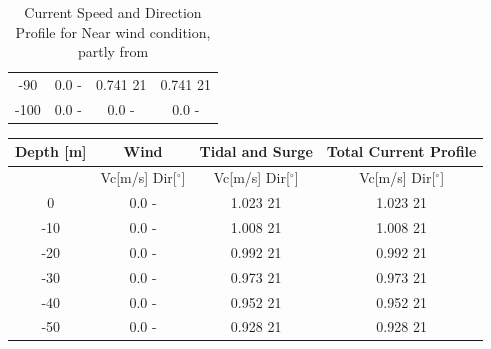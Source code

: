 \begin{table} [H]
\begin{tabular}{ |c|c|c|c|}
 -90 & 0.0 \hspace{0.7cm} - & 0.741 \hspace{0.7cm} 21  & 0.741 \hspace{1.15cm} 21 \\ 
 -100 & 0.0 \hspace{0.7cm} - & 0.0 \hspace{0.7cm} -  & 0.0 \hspace{1.15cm} - \\ 
 \hline
\end{tabular}
\caption{Current Speed and Direction Profile for Near wind condition, partly from \cite{Lifes50+D1.1}}
\label{table:tidcur}
\end{table}   

\begin{table} [H]
\centering
\begin{tabular}{ |c|c|c|c|}
\hline
Depth [m] & Wind & Tidal and Surge & Total Current Profile \\
 \hline
 \hline
 & Vc[m/s] \hspace{0.3cm} Dir[$^{\circ}$] &  Vc[m/s] \hspace{0.3cm} Dir[$^{\circ}$] & Vc[m/s] \hspace{0.3cm} Dir[$^{\circ}$] \\
 \hline
 0 & 0.0 \hspace{0.7cm} - & 1.023 \hspace{0.7cm} 21  & 1.023 \hspace{0.7cm} 21 \\
 -10 & 0.0 \hspace{0.7cm} - & 1.008 \hspace{0.7cm} 21  & 1.008 \hspace{0.7cm} 21 \\
 -20 & 0.0 \hspace{0.7cm} - & 0.992 \hspace{0.7cm} 21  & 0.992
 \hspace{0.7cm} 21 \\
 -30 & 0.0 \hspace{0.7cm} - & 0.973 \hspace{0.7cm} 21  & 0.973 \hspace{0.7cm} 21 \\
 -40 & 0.0 \hspace{0.7cm} - & 0.952 \hspace{0.7cm} 21  & 0.952 \hspace{0.7cm} 21 \\
 -50 & 0.0 \hspace{0.7cm} - & 0.928 \hspace{0.7cm} 21  & 0.928 \hspace{1.15cm} 21 \\

\end{tabular}
\end{table}
